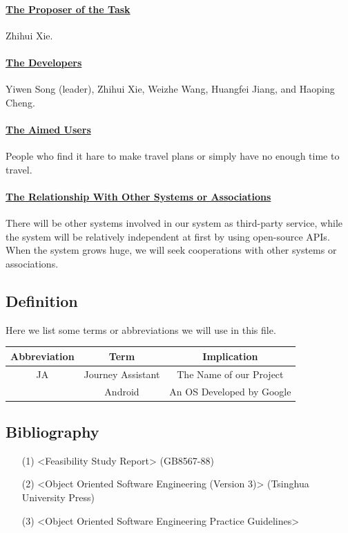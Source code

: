 \documentclass[10pt]{article}
\begin{document}
\paragraph{\underline{The Proposer of the Task}} Zhihui Xie.

\paragraph{\underline{The Developers}} Yiwen Song (leader), Zhihui Xie, Weizhe Wang, Huangfei Jiang, and Haoping Cheng.

\paragraph{\underline{The Aimed Users}} People who find it hare to make travel plans or simply have no enough time to travel.

\paragraph{\underline{The Relationship With Other Systems or Associations}} There will be other systems involved in our system as third-party service, while the system will be relatively independent at first by using open-source APIs. When the system grows huge, we will seek cooperations with other systems or associations.

\subsection{Definition}
Here we list some terms or abbreviations we will use in this file.

\begin{center}
\begin{tabular}{|c|c|c|} 
	\hline 
	Abbreviation&Term&Implication\\
	\hline  
	JA&Journey Assistant&The Name of our Project\\
	\hline 
	 &Android&An OS Developed by Google\\
	\hline
\end{tabular}    
\end{center} 

\subsection{Bibliography}
\begin{itemize}
  \item[(1)] <Feasibility Study Report> (GB8567-88)
  \item[(2)] <Object Oriented Software Engineering (Version 3)> (Tsinghua University Press)
  \item[(3)] <Object Oriented Software Engineering Practice Guidelines>
\end{itemize}
\end{document}
